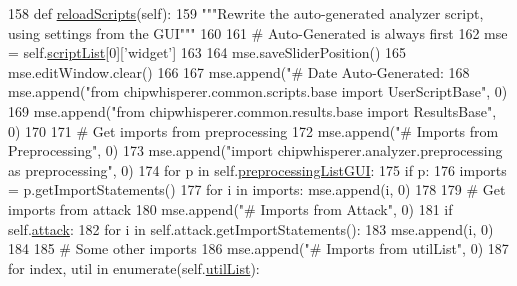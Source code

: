 \begin{DoxyCode}
158     \textcolor{keyword}{def }\hyperlink{classsoftware_1_1chipwhisperer_1_1analyzer_1_1utils_1_1attackscriptgen_1_1AttackScriptGen_adfdc863b08d0767af9d42e4b4381b6a3}{reloadScripts}(self):
159         \textcolor{stringliteral}{"""Rewrite the auto-generated analyzer script, using settings from the GUI"""}
160 
161         \textcolor{comment}{# Auto-Generated is always first}
162         mse = self.\hyperlink{classsoftware_1_1chipwhisperer_1_1analyzer_1_1utils_1_1attackscriptgen_1_1AttackScriptGen_a29de1c09620fd2621a1701a1bc4855f9}{scriptList}[0][\textcolor{stringliteral}{'widget'}]
163 
164         mse.saveSliderPosition()
165         mse.editWindow.clear()
166 
167         mse.append(\textcolor{stringliteral}{"# Date Auto-Generated: %
168         mse.append(\textcolor{stringliteral}{"from chipwhisperer.common.scripts.base import UserScriptBase"}, 0)
169         mse.append(\textcolor{stringliteral}{"from chipwhisperer.common.results.base import ResultsBase"}, 0)
170 
171         \textcolor{comment}{# Get imports from preprocessing}
172         mse.append(\textcolor{stringliteral}{"# Imports from Preprocessing"}, 0)
173         mse.append(\textcolor{stringliteral}{"import chipwhisperer.analyzer.preprocessing as preprocessing"}, 0)
174         \textcolor{keywordflow}{for} p \textcolor{keywordflow}{in} self.\hyperlink{classsoftware_1_1chipwhisperer_1_1analyzer_1_1utils_1_1attackscriptgen_1_1AttackScriptGen_a2a42def4f16bc00d2233121aa2c3ba1f}{preprocessingListGUI}:
175             \textcolor{keywordflow}{if} p:
176                 imports = p.getImportStatements()
177                 \textcolor{keywordflow}{for} i \textcolor{keywordflow}{in} imports: mse.append(i, 0)
178 
179         \textcolor{comment}{# Get imports from attack}
180         mse.append(\textcolor{stringliteral}{"# Imports from Attack"}, 0)
181         \textcolor{keywordflow}{if} self.\hyperlink{classsoftware_1_1chipwhisperer_1_1analyzer_1_1utils_1_1attackscriptgen_1_1AttackScriptGen_a89227b42af2b2b07eebce4ac962554cb}{attack}:
182             \textcolor{keywordflow}{for} i \textcolor{keywordflow}{in} self.attack.getImportStatements():
183                 mse.append(i, 0)
184 
185         \textcolor{comment}{# Some other imports}
186         mse.append(\textcolor{stringliteral}{"# Imports from utilList"}, 0)
187         \textcolor{keywordflow}{for} index, util \textcolor{keywordflow}{in} enumerate(self.\hyperlink{classsoftware_1_1chipwhisperer_1_1analyzer_1_1utils_1_1attackscriptgen_1_1AttackScriptGen_ab57bce3d46587c96e6f4942b46870944}{utilList}):
}
\end{DoxyCode}
